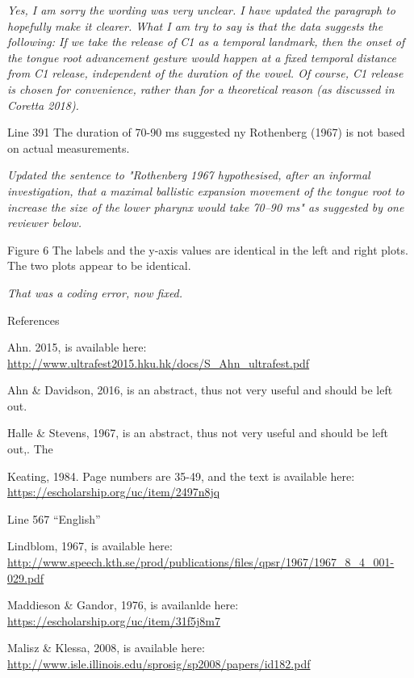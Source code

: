 \documentclass[]{article}
\begin{document}
\begin{adjustwidth}{1cm}{} \textit{
Yes, I am sorry the wording was very unclear. I have updated the paragraph to hopefully make it clearer. What I am try to say is that the data suggests the following: If we take the release of C1 as a temporal landmark, then the onset of the tongue root advancement gesture would happen at a fixed temporal distance from C1 release, independent of the duration of the vowel. Of course, C1 release is chosen for convenience, rather than for a theoretical reason (as discussed in Coretta 2018).
} \end{adjustwidth}

Line 391 The duration of 70-90 ms suggested ny Rothenberg (1967) is not
based on actual measurements.

\begin{adjustwidth}{1cm}{} \textit{
Updated the sentence to "Rothenberg 1967 hypothesised, after an informal investigation, that a maximal ballistic expansion movement of the tongue root to increase the size of the lower pharynx would take 70--90 ms" as suggested by one reviewer below.
} \end{adjustwidth}

Figure 6 The labels and the y-axis values are identical in the left and
right plots. The two plots appear to be identical.

\begin{adjustwidth}{1cm}{} \textit{
That was a coding error, now fixed.
} \end{adjustwidth}

References

Ahn. 2015, is available here:
\url{http://www.ultrafest2015.hku.hk/docs/S_Ahn_ultrafest.pdf}

Ahn \& Davidson, 2016, is an abstract, thus not very useful and should
be left out.

Halle \& Stevens, 1967, is an abstract, thus not very useful and should
be left out,. The

Keating, 1984. Page numbers are 35-49, and the text is available here:
\url{https://escholarship.org/uc/item/2497n8jq}

Line 567 ``English''

Lindblom, 1967, is available here:
\url{http://www.speech.kth.se/prod/publications/files/qpsr/1967/1967_8_4_001-029.pdf}

Maddieson \& Gandor, 1976, is availanlde here:
\url{https://escholarship.org/uc/item/31f5j8m7}

Malisz \& Klessa, 2008, is available here:
\url{http://www.isle.illinois.edu/sprosig/sp2008/papers/id182.pdf}
\end{document}
